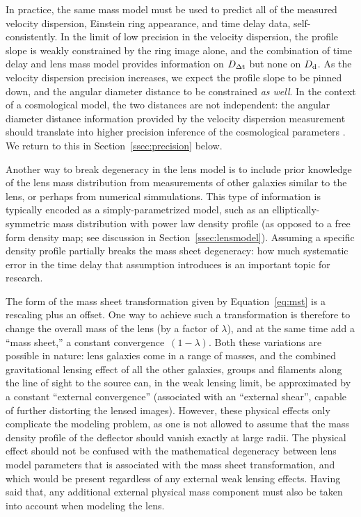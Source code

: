In practice, the same mass model must be used to predict all of the
measured velocity dispersion, Einstein ring appearance, and time
delay data, self-consistently. In the limit of low precision in the
velocity dispersion, the profile slope is weakly constrained by the
ring image alone, and the combination of time delay and lens mass
model provides information on $D_{\Delta{\rm t}}$ but none on $D_{\rm d}$. As the
velocity dispersion precision increases, we expect the profile slope
to be pinned down, and the angular diameter distance to be constrained
{\it as well}. In the context of a cosmological model, the two
distances are not independent: the angular diameter distance
information provided by the velocity dispersion measurement should
translate into higher precision inference of the cosmological
parameters \citep{JeeEtal2016}.  We return to this in
Section~\ref{ssec:precision} below.

Another way to break degeneracy in the lens model is to include prior
knowledge of the lens mass distribution from measurements of other
galaxies similar to the lens, or perhaps from numerical
simmulations. This type of information is typically encoded as a
simply-parametrized model, such as an elliptically-symmetric mass
distribution with power law density profile (as opposed to a free form
density map; see discussion in Section~\ref{ssec:lensmodel}). Assuming
a specific density profile partially breaks the mass sheet degeneracy:
how much systematic error in the time delay that assumption introduces
is an important topic for research.


The form of the mass sheet transformation given by
Equation~\ref{eq:mst} is a rescaling plus an offset. One way to
achieve such a transformation is therefore to change the overall mass
of the lens (by a factor of $\lambda$), and at the same time add a
``mass sheet,'' a constant convergence~$(1-\lambda)$.  Both these
variations are possible in nature: lens galaxies come in a range of
masses, and the combined gravitational lensing effect of all the other
galaxies, groups and filaments along the line of sight to the source
can, in the weak lensing limit, be approximated by a constant
``external convergence'' (associated with an ``external shear'',
capable of further distorting the lensed images). However, these
physical effects only complicate the modeling problem, as one is not
allowed to assume that the mass density profile of the deflector
should vanish exactly at large radii.  The physical effect should not
be confused with the mathematical degeneracy between lens model
parameters that is associated with the mass sheet transformation, and
which would be present regardless of any external weak lensing
effects. Having said that, any additional external physical mass
component must also be taken into account when modeling the lens.

